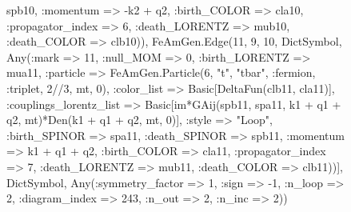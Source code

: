 \documentclass{revtex4}
\begin{document}
\begin{figure}[!htb]
\begin{center}
{spb10, :momentum => -k2 + q2, :birth_COLOR => cla10, :propagator_index => 6, :death_LORENTZ => mub10, :death_COLOR => clb10)), FeAmGen.Edge(11, 9, 10, Dict{Symbol, Any}(:mark => 11, :null_MOM => 0, :birth_LORENTZ => mua11, :particle => FeAmGen.Particle(6, "t", "tbar", :fermion, :triplet, 2//3, mt, 0), :color_list => Basic[DeltaFun(clb11, cla11)], :couplings_lorentz_list => Basic[im*GAij(spb11, spa11, k1 + q1 + q2, mt)*Den(k1 + q1 + q2, mt, 0)], :style => "Loop", :birth_SPINOR => spa11, :death_SPINOR => spb11, :momentum => k1 + q1 + q2, :birth_COLOR => cla11, :propagator_index => 7, :death_LORENTZ => mub11, :death_COLOR => clb11))], Dict{Symbol, Any}(:symmetry_factor => 1, :sign => -1, :n_loop => 2, :diagram_index => 243, :n_out => 2, :n_inc => 2)) 
}
\end{center}
\end{figure}
\end{document}
